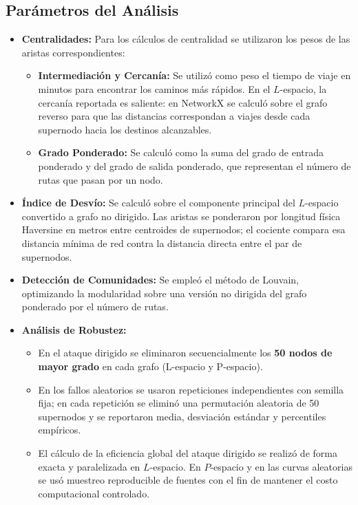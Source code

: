        \subsection{Parámetros del Análisis}

            \begin{itemize}
                \item \textbf{Centralidades:} Para los cálculos de centralidad se utilizaron los pesos de las aristas correspondientes:
                \begin{itemize}
                    \item \textbf{Intermediación y Cercanía:} Se utilizó como peso el tiempo de viaje en minutos para encontrar los caminos más rápidos. En el \(L\)-espacio, la cercanía reportada es saliente: en NetworkX se calculó sobre el grafo reverso para que las distancias correspondan a viajes desde cada supernodo hacia los destinos alcanzables.
                    \item \textbf{Grado Ponderado:} Se calculó como la suma del grado de entrada ponderado y del grado de salida ponderado, que representan el número de rutas que pasan por un nodo.
                \end{itemize}
                \item \textbf{Índice de Desvío:} Se calculó sobre el componente principal del \(L\)-espacio convertido a grafo no dirigido. Las aristas se ponderaron por longitud física Haversine en metros entre centroides de supernodos; el cociente compara esa distancia mínima de red contra la distancia directa entre el par de supernodos.
                \item \textbf{Detección de Comunidades:} Se empleó el método de Louvain, optimizando la modularidad sobre una versión no dirigida del grafo ponderado por el número de rutas.
                \item \textbf{Análisis de Robustez:}
                \begin{itemize}
                    \item En el ataque dirigido se eliminaron secuencialmente los \textbf{50 nodos de mayor grado} en cada grafo (L-espacio y P-espacio).
                    \item En los fallos aleatorios se usaron repeticiones independientes con semilla fija; en cada repetición se eliminó una permutación aleatoria de 50 supernodos y se reportaron media, desviación estándar y percentiles empíricos.
                    \item El cálculo de la eficiencia global del ataque dirigido se realizó de forma exacta y paralelizada en \(L\)-espacio. En \(P\)-espacio y en las curvas aleatorias se usó muestreo reproducible de fuentes con el fin de mantener el costo computacional controlado.

\end{itemize}
\end{itemize}

